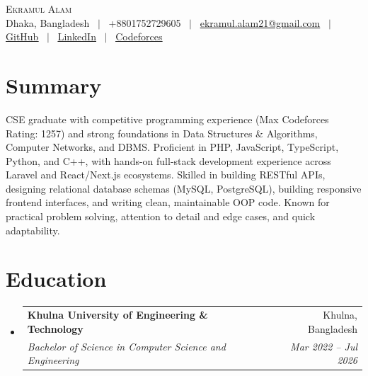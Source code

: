 \documentclass[letterpaper,10.5pt]{article}
\makeatletter
\newcommand{\resumeSubheading}[4]{
  \vspace{-2pt}\item
    \begin{tabular*}{\textwidth}[t]{l@{\extracolsep{\fill}}r}
      \textbf{#1} & #2 \\
      \textit{\small#3} & \textit{\small #4} \\
    \end{tabular*}\vspace{-7pt}
}
\newcommand{\resumeSubHeadingListStart}{\begin{itemize}[leftmargin=0.0in, label={}]}
\newcommand{\resumeSubHeadingListEnd}{\end{itemize}}
\makeatother
\begin{document}
\begin{center}
    {\Huge \scshape Ekramul Alam} \\ \vspace{4pt}
    \small Dhaka, Bangladesh ~$|$~ +8801752729605 ~$|$~
    \href{mailto:ekramul.alam21@gmail.com}{ekramul.alam21@gmail.com} ~$|$~
    \href{https://github.com/Apn7}{\underline{GitHub}} ~$|$~
    \href{https://www.linkedin.com/in/ekramul-alam-525659255/}{\underline{LinkedIn}} ~$|$~
    \href{https://codeforces.com/profile/Apn7}{\underline{Codeforces}}
    \vspace{-6pt}
\end{center}

\section{Summary}
\small{CSE graduate with competitive programming experience (Max Codeforces Rating: 1257) and strong foundations in Data Structures \& Algorithms, Computer Networks, and DBMS. Proficient in PHP, JavaScript, TypeScript, Python, and C++, with hands-on full-stack development experience across Laravel and React/Next.js ecosystems. Skilled in building RESTful APIs, designing relational database schemas (MySQL, PostgreSQL), building responsive frontend interfaces, and writing clean, maintainable OOP code. Known for practical problem solving, attention to detail and edge cases, and quick adaptability.}
\vspace{-4pt}

\section{Education}
  \resumeSubHeadingListStart
    \resumeSubheading
      {Khulna University of Engineering \& Technology}{Khulna, Bangladesh}
      {Bachelor of Science in Computer Science and Engineering}{Mar 2022 -- Jul 2026}
  \resumeSubHeadingListEnd
\vspace{-6pt}

\end{document}
